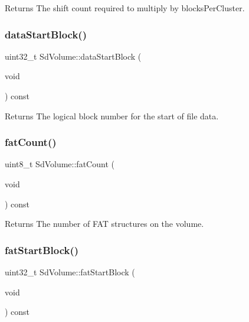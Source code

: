 \begin{DoxyReturn}{Returns}
The shift count required to multiply by blocks\+Per\+Cluster. 
\end{DoxyReturn}
\mbox{\label{class_sd_volume_a8e6813781321490fad895ce7b16a8638}} 
\subsubsection{\texorpdfstring{data\+Start\+Block()}{dataStartBlock()}}
{\footnotesize\ttfamily uint32\+\_\+t Sd\+Volume\+::data\+Start\+Block (\begin{DoxyParamCaption}\item[{void}]{ }\end{DoxyParamCaption}) const\hspace{0.3cm}{\ttfamily [inline]}}

\begin{DoxyReturn}{Returns}
The logical block number for the start of file data. 
\end{DoxyReturn}
\mbox{\label{class_sd_volume_ad0985d6a2a136aedacd7678977b0e015}} 
\subsubsection{\texorpdfstring{fat\+Count()}{fatCount()}}
{\footnotesize\ttfamily uint8\+\_\+t Sd\+Volume\+::fat\+Count (\begin{DoxyParamCaption}\item[{void}]{ }\end{DoxyParamCaption}) const\hspace{0.3cm}{\ttfamily [inline]}}

\begin{DoxyReturn}{Returns}
The number of F\+AT structures on the volume. 
\end{DoxyReturn}
\mbox{\label{class_sd_volume_a05f8847162b9d9f77b1b8db95cd63cec}} 
\subsubsection{\texorpdfstring{fat\+Start\+Block()}{fatStartBlock()}}
{\footnotesize\ttfamily uint32\+\_\+t Sd\+Volume\+::fat\+Start\+Block (\begin{DoxyParamCaption}\item[{void}]{ }\end{DoxyParamCaption}) const\hspace{0.3cm}{\ttfamily [inline]}}

